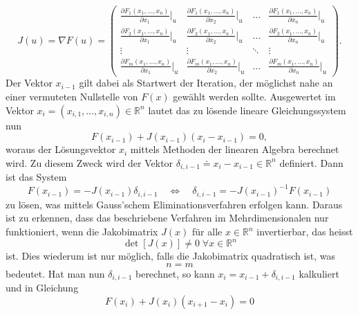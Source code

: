 \documentclass[a4paper,12pt]{article}
\numberwithin{equation}{section}
\begin{document}
\begin{equation}
J(u) = \nabla F(u) = \begin{pmatrix}
\frac{\partial F_1(x_1,\dots,x_n)}{\partial x_1}\big|_{u} & \frac{\partial F_1(x_1,\dots,x_n)}{\partial x_2}\big|_{u} & \dots & \frac{\partial F_1(x_1,\dots,x_n)}{\partial x_n}\big|_{u} \\
\frac{\partial F_2(x_1,\dots,x_n)}{\partial x_1}\big|_{u} & \frac{\partial F_2(x_1,\dots,x_n)}{\partial x_2}\big|_{u} & \dots & \frac{\partial F_2(x_1,\dots,x_n)}{\partial x_n}\big|_{u} \\
\vdots & \vdots & \ddots & \vdots \\
\frac{\partial F_m(x_1,\dots,x_n)}{\partial x_1}\big|_{u} & \frac{\partial F_m(x_1,\dots,x_n)}{\partial x_2}\big|_{u} & \dots & \frac{\partial F_m(x_1,\dots,x_n)}{\partial x_n}\big|_{u}
\end{pmatrix}.
\end{equation} Der Vektor $x_{i-1}$ gilt dabei als Startwert der Iteration, der möglichst nahe an einer vermuteten Nullstelle von $F(x)$ gewählt werden sollte. Ausgewertet im Vektor $x_i = (x_{i,1},\dots,x_{i,n})\in\mathbb{R}^n$ lautet das zu lösende lineare Gleichungssystem nun \begin{equation} F(x_{i-1}) + J(x_{i-1})(x_i-x_{i-1}) = 0,
\end{equation} woraus der Lösungsvektor $x_i$ mittels Methoden der linearen Algebra berechnet wird. Zu diesem Zweck wird der Vektor $\delta_{i,i-1} \doteq x_i-x_{i-1} \in \mathbb{R}^n$ definiert. Dann ist das System \begin{equation}F(x_{i-1}) = -J(x_{i-1})\delta_{i,i-1} \quad \Leftrightarrow \quad \delta_{i,i-1} = -J(x_{i-1})^{-1}F(x_{i-1}) \end{equation} zu lösen, was mittels Gauss'schem Eliminationsverfahren erfolgen kann. Daraus ist zu erkennen, dass das beschriebene Verfahren im Mehrdimensionalen nur funktioniert, wenn die Jakobimatrix $J(x)$ für alle $x \in \mathbb{R}^n$ invertierbar, das heisst \begin{equation}
\det[J(x)] \neq 0 \; \forall x \in \mathbb{R}^n
\end{equation} ist. Dies wiederum ist nur möglich, falls die Jakobimatrix quadratisch ist, was \begin{equation}
n = m
\end{equation} bedeutet. Hat man nun $\delta_{i,i-1}$ berechnet, so kann $x_i = x_{i-1} + \delta_{i,i-1}$ kalkuliert und in Gleichung \begin{equation}
F(x_{i}) + J(x_{i})(x_{i+1}-x_{i}) = 0

\end{equation}
\end{document}
